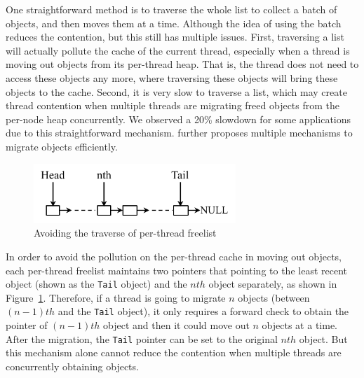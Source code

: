 One straightforward method is to traverse the whole list to collect a batch of objects, and then moves them at a time. Although the idea of using the batch reduces the contention, but this still has multiple issues. First, traversing a list will actually pollute the cache of the current thread, especially when a thread is moving out objects from its per-thread heap. That is, the thread does not need to access these objects any more, where traversing these objects will bring these objects to the cache. Second, it is very slow to traverse a list, which may create thread contention when multiple threads are migrating freed objects from the per-node heap concurrently. We observed a 20\% slowdown for some applications due to this straightforward mechanism. \NM{} further proposes multiple mechanisms to migrate objects efficiently. 

\begin{figure}
\centering
\includegraphics[width=3in]{figure/perthreadlist}
\vspace{-0.1in}
\caption{Avoiding the traverse of per-thread freelist\label{fig:perthreadlist}}
\vspace{-0.1in}
\end{figure}
In order to avoid the pollution on the per-thread cache in moving out objects, each per-thread freelist maintains two pointers that pointing to the least recent object (shown as the \texttt{Tail} object) and the $nth$ object separately, as shown in Figure~\ref{fig:perthreadlist}. Therefore, if a thread is going to migrate $n$ objects (between $(n-1)th$ and the \texttt{Tail} object), it only requires a forward check to obtain the pointer of $(n-1)th$ object and then it could move out $n$ objects at a time. After the migration,  the \texttt{Tail} pointer can be set to the original $nth$ object. But this mechanism alone cannot reduce the contention when multiple threads are concurrently obtaining objects.


